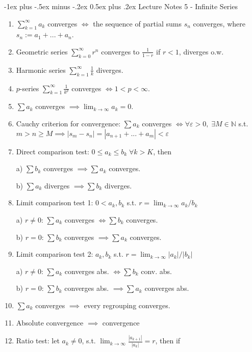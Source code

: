 \documentclass[10pt,landscape]{article}
\makeatletter
\renewcommand{\section}{\@startsection{section}{1}{0mm}%
                                {-1ex plus -.5ex minus -.2ex}%
                                {0.5ex plus .2ex}%
                                {\normalfont\large\bfseries}}
\makeatother
\begin{document}
\begin{multicols}{3}
\section{Lecture Notes 5 - Infinite Series}
\begin{enumerate}
	\item $\sum^\infty_{k=1} a_k $ converges $\iff$ the sequence of partial sums $s_n$ converges, where $s_n := a_1 + ... + a_n$.
	\item Geometric series $\sum^\infty_{k=0} r^n $ converges to $\frac{1}{1-r}$ if $r<1$, diverges o.w.
	\item Harmonic series $\sum^\infty_{k=1}\frac{1}{k}$ diverges.
	\item $p$-series $\sum^\infty_{k=1}\frac{1}{k^p}$ converges $ \iff 1<p<\infty$.
	\item $\sum a_k$ converges $ \implies \lim_{k\rightarrow \infty} a_k = 0$.
	\item Cauchy criterion for convergence: $\sum a_k$ converges $\iff \forall \varepsilon >0, \; \exists M\in \mathbb{N} $ s.t. $m>n\geq M  \implies |s_m -s_n| = |a_{n+1} + ...+ a_m | < \varepsilon$
	\item Direct comparison test: $0\leq a_k\leq b_k \; \forall k>K$, then
	
	a) $\sum b_k$ converges $\implies \sum a_k$ converges.
	
	b) $\sum a_k$ diverges $\implies \sum b_k$ diverges.
	\item Limit comparison test 1: $0<a_k, b_k $ s.t. $r = \lim_{k\rightarrow \infty} a_k/b_k$
	
	a) $r\neq 0$: $\sum a_k$ converges $\iff \sum b_k$ converges.
	
	b) $r = 0$: $\sum b_k$ converges $\implies \sum a_k$ converges. 
	\item Limit comparison test 2: $a_k, b_k $ s.t. $r = \lim_{k\rightarrow \infty} |a_k|/|b_k|$
	
	a) $r\neq 0$: $\sum a_k$ converges abs. $\iff \sum b_k$ conv. abs.
	
	b) $r = 0$: $\sum b_k$ converges abs. $\implies \sum a_k$ converges abs. 

	
	\item $\sum a_k$ converges $\implies$ every regrouping converges.
	
	\item Absolute convergence $\implies $ convergence
	
	\item Ratio test: let $a_k \neq 0$, s.t. $\lim_{k \rightarrow \infty} \frac{|a_{k+1}|}{ |a_k|} = r $, then if
	

\end{enumerate}
\end{multicols}
\end{document}
